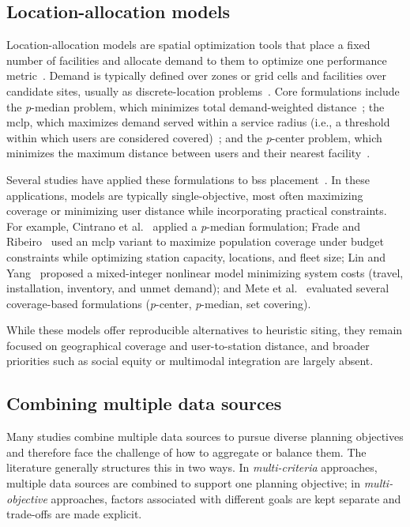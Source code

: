 \subsection{Location-allocation models} \label{sec:location_allocation_models}

Location-allocation models are spatial optimization tools that place a fixed number of facilities and allocate demand to them to optimize one performance metric~\cite{Daskin1995}. Demand is typically defined over zones or grid cells and facilities over candidate sites, usually as discrete-location problems~\cite{Teixeira2008}. Core formulations include the \textit{p}-median problem, which minimizes total demand-weighted distance~\cite{Hakimi1965}; the \ac{mclp}, which maximizes demand served within a service radius (i.e., a threshold within which users are considered covered)~\cite{Church1974}; and the \textit{p}-center problem, which minimizes the maximum distance between users and their nearest facility~\cite{Hakimi1964}.

Several studies have applied these formulations to \ac{bss} placement~\cite{Frade2015, Cintrano2018, Lin2011, Mete2018}. In these applications, models are typically single-objective, most often maximizing coverage or minimizing user distance while incorporating practical constraints. For example, Cintrano et al.~\cite{Cintrano2018} applied a \textit{p}-median formulation; Frade and Ribeiro~\cite{Frade2015} used an \ac{mclp} variant to maximize population coverage under budget constraints while optimizing station capacity, locations, and fleet size; Lin and Yang~\cite{Lin2011} proposed a mixed-integer nonlinear model minimizing system costs (travel, installation, inventory, and unmet demand); and Mete et al.~\cite{Mete2018} evaluated several coverage-based formulations (\textit{p}-center, \textit{p}-median, set covering).

While these models offer reproducible alternatives to heuristic siting, they remain focused on geographical coverage and user-to-station distance, and broader priorities such as social equity or multimodal integration are largely absent.


\subsection{Combining multiple data sources} \label{sec:combining_multiple_data_sources}

Many studies combine multiple data sources to pursue diverse planning objectives and therefore face the challenge of how to aggregate or balance them. The literature generally structures this in two ways. In \textit{multi-criteria} approaches, multiple data sources are combined to support one planning objective; in \textit{multi-objective} approaches, factors associated with different goals are kept separate and trade-offs are made explicit.


